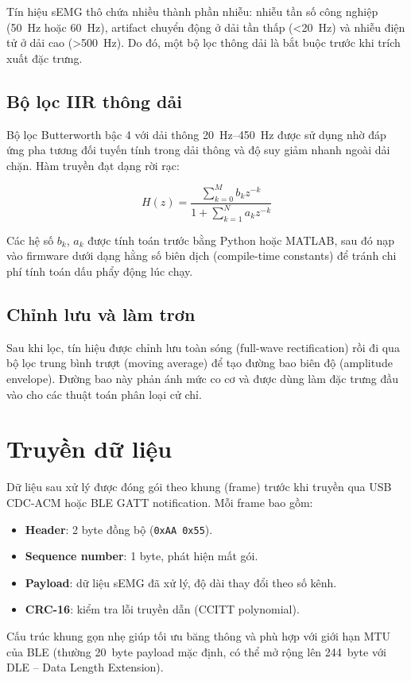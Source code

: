 Tín hiệu sEMG thô chứa nhiều thành phần nhiễu: nhiễu tần số công nghiệp (\SI{50}{Hz} hoặc \SI{60}{Hz}), artifact chuyển động ở dải tần thấp (<\SI{20}{Hz}) và nhiễu điện tử ở dải cao (>\SI{500}{Hz}). Do đó, một bộ lọc thông dải là bắt buộc trước khi trích xuất đặc trưng.

\subsection{Bộ lọc IIR thông dải}

Bộ lọc Butterworth bậc 4 với dải thông \SIrange{20}{450}{Hz} được sử dụng nhờ đáp ứng pha tương đối tuyến tính trong dải thông và độ suy giảm nhanh ngoài dải chặn. Hàm truyền đạt dạng rời rạc:

\begin{equation}
    H(z) = \frac{\sum_{k=0}^{M} b_k z^{-k}}{1 + \sum_{k=1}^{N} a_k z^{-k}}
    \label{eq:iir}
\end{equation}

Các hệ số $b_k$, $a_k$ được tính toán trước bằng Python hoặc MATLAB, sau đó nạp vào firmware dưới dạng hằng số biên dịch (compile-time constants) để tránh chi phí tính toán dấu phẩy động lúc chạy.

\subsection{Chỉnh lưu và làm trơn}

Sau khi lọc, tín hiệu được chỉnh lưu toàn sóng (full-wave rectification) rồi đi qua bộ lọc trung bình trượt (moving average) để tạo đường bao biên độ (amplitude envelope). Đường bao này phản ánh mức co cơ và được dùng làm đặc trưng đầu vào cho các thuật toán phân loại cử chỉ.

\section{Truyền dữ liệu}

Dữ liệu sau xử lý được đóng gói theo khung (frame) trước khi truyền qua USB CDC-ACM hoặc BLE GATT notification. Mỗi frame bao gồm:

\begin{itemize}
    \item \textbf{Header}: 2 byte đồng bộ (\texttt{0xAA 0x55}).
    \item \textbf{Sequence number}: 1 byte, phát hiện mất gói.
    \item \textbf{Payload}: dữ liệu sEMG đã xử lý, độ dài thay đổi theo số kênh.
    \item \textbf{CRC-16}: kiểm tra lỗi truyền dẫn (CCITT polynomial).
\end{itemize}

Cấu trúc khung gọn nhẹ giúp tối ưu băng thông và phù hợp với giới hạn MTU của BLE (thường \SI{20}{byte} payload mặc định, có thể mở rộng lên \SI{244}{byte} với DLE -- Data Length Extension).

